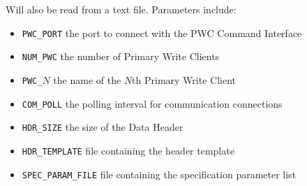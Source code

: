 Will also be read from a text file.  Parameters include:
\begin{itemize}
\item{\tt PWC\_PORT} the port to connect with the PWC Command Interface 
\item{\tt NUM\_PWC} the number of Primary Write Clients
\item{\tt PWC\_$N$} the name of the $N$th Primary Write Client
\item{\tt COM\_POLL} the polling interval for communication connections
\item{\tt HDR\_SIZE} the size of the Data Header
\item{\tt HDR\_TEMPLATE} file containing the header template
\item{\tt SPEC\_PARAM\_FILE} file containing the specification parameter list
\end{itemize}

